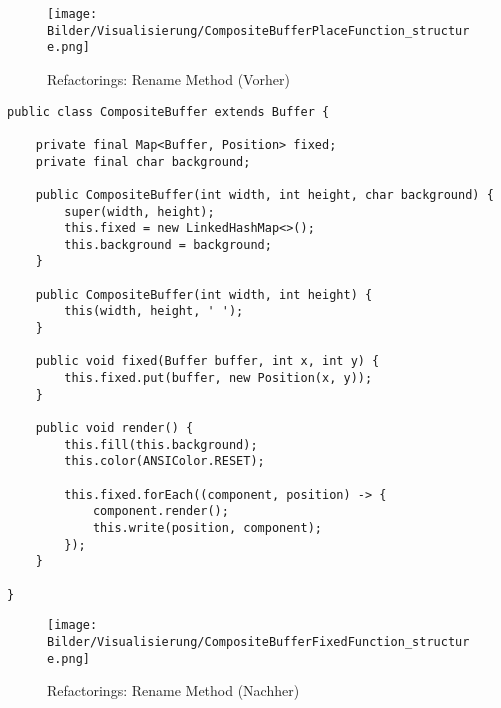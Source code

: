 \vspace{0.5cm}
\begin{figure}[H]
    \centering
    \texttt{[image: Bilder/Visualisierung/CompositeBufferPlaceFunction\_structure.png]}
    \caption{Refactorings: Rename Method (Vorher)}
\end{figure}

\vspace{0.5cm}
\begin{lstlisting}[caption={Refactorings: Rename Method (Nachher)}]
public class CompositeBuffer extends Buffer {
    
    private final Map<Buffer, Position> fixed;
    private final char background;
    
    public CompositeBuffer(int width, int height, char background) {
        super(width, height);
        this.fixed = new LinkedHashMap<>();
        this.background = background;
    }
    
    public CompositeBuffer(int width, int height) {
        this(width, height, ' ');
    }
    
    public void fixed(Buffer buffer, int x, int y) {
        this.fixed.put(buffer, new Position(x, y));
    }
    
    public void render() {
        this.fill(this.background);
        this.color(ANSIColor.RESET);
        
        this.fixed.forEach((component, position) -> {
            component.render();
            this.write(position, component);
        });
    }
    
}
\end{lstlisting}

\vspace{0.5cm}
\begin{figure}[H]
    \centering
    \texttt{[image: Bilder/Visualisierung/CompositeBufferFixedFunction\_structure.png]}
    \caption{Refactorings: Rename Method (Nachher)}
\end{figure}

